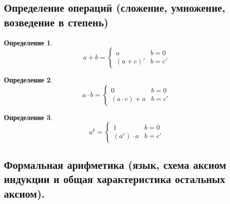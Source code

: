 \documentclass[english]{article}
\theoremstyle{plain}
\theoremstyle{remark}
\theoremstyle{definition}
\newtheorem*{definition}{Определение}
\begin{document}
\subsection{Определение операций (сложение, умножение, возведение в степень)}
\label{sec:org569ea1a}
\begin{definition}
\[ a + b = \begin{cases}
a & b = 0 \\
(a + c)' & b = c'
\end{cases}\]
\label{org343891e}
\end{definition}
\begin{definition}
\[ a \cdot b = \begin{cases}
0 & b = 0 \\
(a \cdot c) + a & b = c'
\end{cases}\]
\label{orgbc243d6}
\end{definition}
\begin{definition}
\[ a^b = \begin{cases}
1 & b = 0 \\
(a^c)\cdot a & b = c'
\end{cases}\]
\label{org57f63f1}
\end{definition}
\subsection{Формальная арифметика (язык, схема аксиом индукции и общая характеристика остальных аксиом).}
\label{sec:orgd811106}
\end{document}
